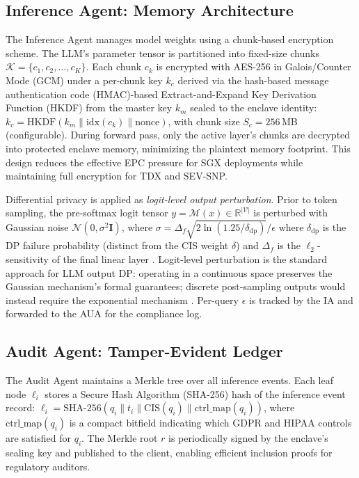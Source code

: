 \documentclass{ieeeaccess}
\begin{document}
\subsection{Inference Agent: Memory Architecture}

The Inference Agent manages model weights using a chunk-based encryption
scheme. The LLM's parameter tensor is partitioned into fixed-size chunks
$\mathcal{K} = \{c_1, c_2, \ldots, c_K\}$. Each chunk $c_k$ is encrypted with AES-256 in Galois/Counter Mode (GCM) under a per-chunk key $k_c$ derived via the hash-based message authentication code (HMAC)-based Extract-and-Expand Key Derivation Function (HKDF) from the
master key $k_m$ sealed to the enclave identity:
$k_c = \mathrm{HKDF}(k_m \| \mathrm{idx}(c_k) \| \mathrm{nonce})$,
with chunk size $S_c = 256$\,MB (configurable). During forward pass, only the
active layer's chunks are decrypted into
protected enclave memory, minimizing the plaintext memory footprint.
This design reduces the effective EPC pressure for SGX deployments while
maintaining full encryption for TDX and SEV-SNP.

Differential privacy is applied as \emph{logit-level output perturbation}.
Prior to token sampling, the pre-softmax logit tensor
$y \!=\! \mathcal{M}(x) \!\in\! \mathbb{R}^{|\mathcal{V}|}$ is perturbed
with Gaussian noise $\mathcal{N}(0, \sigma^2 \mathbf{I})$, where
$\sigma \!=\! \Delta_f \sqrt{2 \ln(1.25/\delta_{\mathrm{dp}})} / \epsilon$
where $\delta_{\mathrm{dp}}$ is the DP failure probability (distinct from the CIS weight $\delta$) and $\Delta_f$ is the $\ell_2$-sensitivity of the final linear layer
\cite{dwork2014algorithmic}. Logit-level perturbation is the standard
approach for LLM output DP: operating in a continuous space preserves the
Gaussian mechanism's formal guarantees; discrete post-sampling outputs
would instead require the exponential mechanism \cite{mcsherry2007mechanism}.
Per-query $\epsilon$ is tracked by the IA and forwarded to the AUA for
the compliance log.

\subsection{Audit Agent: Tamper-Evident Ledger}

The Audit Agent maintains a Merkle tree over all inference events. Each
leaf node $\ell_i$ stores a Secure Hash Algorithm (SHA-256) hash of the inference event record:
$\ell_i = \mathrm{SHA\text{-}256}(q_i \| t_i \| \mathrm{CIS}(q_i) \| \text{ctrl\_map}(q_i))$,
where $\text{ctrl\_map}(q_i)$ is a compact bitfield indicating which
GDPR and HIPAA controls are satisfied for $q_i$. The Merkle root $r$ is
periodically signed by the enclave's sealing key and published to the
client, enabling efficient inclusion proofs for regulatory auditors.
\end{document}

